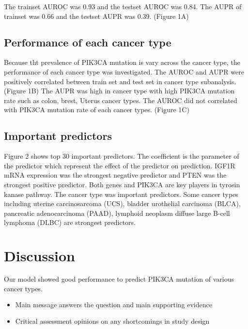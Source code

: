 \documentclass[10pt,letterpaper]{article}
\begin{document}
The trainset AUROC was 0.93 and the testset AUROC was 0.84. The AUPR of
trainset was 0.66 and the testset AUPR was 0.39. (Figure 1A)

\hypertarget{performance-of-each-cancer-type}{%
\subsection{Performance of each cancer
type}\label{performance-of-each-cancer-type}}

Because tht prevalence of PIK3CA mutation is vary across the cancer
type, the performance of each cancer type was investigated. The AUROC
and AUPR were positively correlated between train set and test set in
cancer type subanalysis. (Figure 1B) The AUPR was high in cancer type
with high PIK3CA mutation rate such as colon, brest, Uterus cancer
types. The AUROC did not correlated with PIK3CA mutation rate of each
cancer types. (Figure 1C)

\hypertarget{important-predictors}{%
\subsection{Important predictors}\label{important-predictors}}

Figure 2 shows top 30 important predictors. The coefficient is the
parameter of the predictor which represent the effect of the predictor
on prediction. IGF1R mRNA expression was the strongest negative
predictor and PTEN was the strongest positive predictor. Both genes and
PIK3CA are key players in tyrosin kanase pathway. The cancer type was
important predictors. Some cancer types including uterine carcinosarcoma
(UCS), bladder urothelial carcinoma (BLCA), pancreatic adenocarcinoma
(PAAD), lymphoid neoplasm diffuse large B-cell lymphoma (DLBC) are
strongest predictors.

\hypertarget{discussion}{%
\section{Discussion}\label{discussion}}

Our model showed good performance to predict PIK3CA mutation of various
cancer types.

\begin{itemize}
\item
  Main message answers the question and main supporting evidence
\item
  Critical assessment opinions on any shortcomings in study design
\end{itemize}
\end{document}
